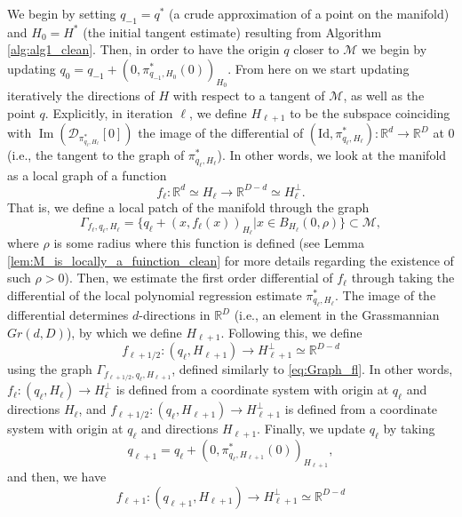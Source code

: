 \documentclass[12pt]{article}
\theoremstyle{remark}
\newcommand{\RR}{\mathbb{R}}
\newcommand{\MM}{\mathcal{M}}
\newcommand{\DD}{\mathcal{D}}
\DeclareMathOperator{\Ima}{Im}
\begin{document}
We begin by setting $q_{-1} = q^*$ (a crude approximation of a point on the manifold) and $H_0 = H^*$ (the initial tangent estimate) resulting from Algorithm \ref{alg:alg1_clean}.
Then, in order to have the origin $q$ closer to $\MM$ we begin by updating $q_0 = q_{-1} + (0, \pi^*_{q_{-1}, H_0}(0))_{H_0}$.
From here on we start updating iteratively the directions of $H$ with respect to a tangent of $\MM$, as well as the point $ q $.
Explicitly, in iteration $\ell$, we define $H_{\ell+1}$ to be the subspace coinciding with $ \Ima(\DD_{\pi^*_{q_{\ell}, H_{\ell}}}[0]) $ the image of the differential of $(\textrm{Id},\pi^*_{q_{\ell},H_{\ell}}):\RR^d\to\RR^D$ at $ 0 $ (i.e., the tangent to the graph of $ \pi^*_{q_{\ell  }, H_{\ell }} $).
In other words, we look at the manifold as a local graph of a function 
\begin{equation}
f_{\ell}:\RR^d\simeq H_\ell \to \RR^{D-d} \simeq H_\ell ^\perp 
.\end{equation}
That is, we define a local patch of the manifold through the graph 
\begin{equation}\label{eq:Graph_fl}
\Gamma_{f_\ell, q_\ell, H_\ell} = \{q_\ell + (x, f_\ell(x))_{H_\ell} | x\in B_{H_\ell}(0,\rho) \}\subset\MM,   
\end{equation}
where $\rho$ is some radius where this function is defined (see Lemma \ref{lem:M_is_locally_a_fuinction_clean} for more details regarding the existence of such $\rho > 0$). 
Then, we estimate the first order differential of $f_\ell$ through taking the differential of the local polynomial regression estimate $\pi^*_{q_{\ell},H_{\ell }}$.
The image of the differential determines $d$-directions in $\RR^D$ (i.e., an element in the Grassmannian $Gr(d,D)$), by which we define $H_{\ell+1}$. 
Following this, we define 
\begin{equation}\label{eq:fl12_def}
    f_{\ell+1/2}:(q_\ell, H_{\ell+1}) \to H_{\ell+1} ^\perp \simeq \RR^{D-d}
\end{equation} 
using the graph $\Gamma_{f_{\ell+1/2}, q_\ell, H_{\ell+1}}$, defined similarly to \eqref{eq:Graph_fl}.
In other words, $f_\ell:(q_\ell, H_\ell)\to H_\ell^\perp$ is defined from a coordinate system with origin at $q_\ell$ and directions $H_\ell$, and $f_{\ell + 1/2}:(q_\ell, H_{\ell+1})\to H_{\ell+1}^\perp$ is defined from a coordinate system with origin at $q_\ell$ and directions $H_{\ell+1}$.
Finally, we update $q_\ell$ by taking 
\begin{equation}\label{eq:ql_definition}
q_{\ell+1} = q_\ell + (0, \pi^*_{q_{\ell }, H_{\ell+1}}(0))_{H_{\ell + 1}} ,
\end{equation}
and then, we have 
\begin{equation}\label{eq:fl_def}
f_{\ell+1}:(q_{\ell+1}, H_{\ell+1}) \to H_{\ell+1} ^\perp \simeq \RR^{D-d}    
\end{equation}
\end{document}
